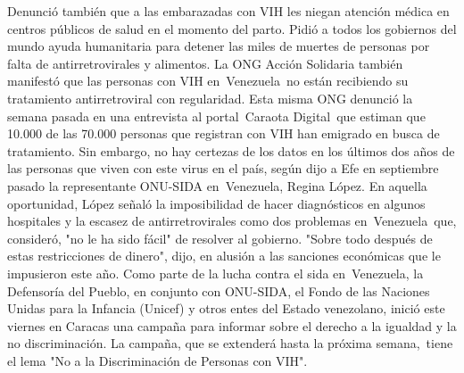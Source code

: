 \documentclass{article}%
\begin{document}
\newline%
%
Denunció también que a las embarazadas con VIH les niegan atención médica en centros públicos de salud en el momento del parto.%
\newline%
%
Pidió a todos los gobiernos del mundo ayuda humanitaria para detener las miles de muertes de personas por falta de antirretrovirales y alimentos.%
\newline%
%
La ONG Acción Solidaria también manifestó que las personas con VIH en~Venezuela~no están recibiendo su tratamiento antirretroviral con regularidad.%
\newline%
%
Esta misma ONG denunció la semana pasada en una entrevista al portal~Caraota Digital~que estiman que 10.000 de las 70.000 personas que registran con VIH han emigrado en busca de tratamiento.%
\newline%
%
Sin embargo, no hay certezas de los datos en los últimos dos años de las personas que viven con este virus en el país, según dijo a Efe en septiembre pasado la representante ONU{-}SIDA en~Venezuela, Regina López.%
\newline%
%
En aquella oportunidad, López señaló la imposibilidad de hacer diagnósticos en algunos hospitales y la escasez de antirretrovirales como dos problemas en~Venezuela~que, consideró, "no le ha sido fácil" de resolver al gobierno. "Sobre todo después de estas restricciones de dinero", dijo, en alusión a las sanciones económicas que le impusieron este año.%
\newline%
%
Como parte de la lucha contra el sida en~Venezuela, la Defensoría del Pueblo, en conjunto con ONU{-}SIDA, el Fondo de las Naciones Unidas para la Infancia (Unicef) y otros entes del Estado venezolano, inició este viernes en Caracas una campaña para informar sobre el derecho a la igualdad y la no discriminación.%
\newline%
%
La campaña, que se extenderá hasta la próxima semana,~tiene el lema "No a la Discriminación de Personas con VIH".%
\newline%
%
\end{document}
